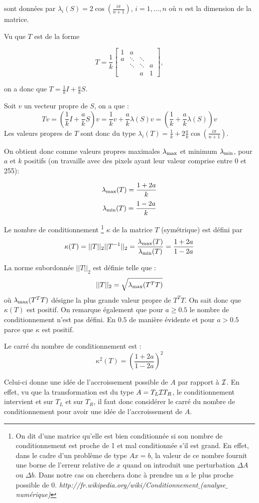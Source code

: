 sont données par $\lambda_i(S) = 2 \cos(\frac{i\pi}{n+1})$, $i= 1, \ldots , n$ où $n$ est la dimension de la matrice.

Vu que $T$ est de la forme

$$
 T = \frac{1}{k}
 \begin{bmatrix}
    1 & a 		& 			& \\
    a & \ddots 	& \ddots 	& \\
      & \ddots 	& \ddots 	& a \\
      & 		& a			& 1
  \end{bmatrix},
$$

on a donc que $T = \frac{1}{k} I + \frac{a}{k} S$.

Soit $v$ un vecteur propre de $S$, on a que :
\begin{equation}
T v = \left( \frac{1}{k} I + \frac{a}{k} S \right) v =
\frac{1}{k} v + \frac{a}{k} \lambda(S) v = \left(\frac{1}{k} + \frac{a}{k} \lambda(S)\right) v
\end{equation}
Les valeurs propres de $T$ sont donc du type $\lambda_i(T) = \frac{1}{k} + 2 \frac{a}{k} \cos(\frac{i\pi}{n+1})$.

On obtient donc comme valeurs propres maximales $\lambda_\mathrm{max}$ et minimum $\lambda_\mathrm{min}$,
pour $a$ et $k$ positifs (on travaille avec des pixels ayant leur valeur comprise entre 0 et 255):

$$\lambda_\mathrm{max} (T) =  \frac{1+2a}{k} $$
$$\lambda_\mathrm{min} (T) =  \frac{1-2a}{k} $$

Le nombre de conditionnement
\footnote{On dit d'une matrice qu'elle est bien conditionnée si son nombre de conditionnement
  est proche de 1 et mal conditionnée s'il est grand.
En effet, dans le cadre d'un problème de type $Ax = b$,
la valeur de ce nombre fournit une borne de l'erreur relative de $x$ quand on introduit une perturbation $\Delta A $ ou $\Delta b$.
Dans notre cas on cherchera donc à prendre un $a$ le plus proche possible de 0.
\textit{http://fr.wikipedia.org/wiki/Conditionnement$\_$(analyse$\_$numérique)}}
 $\kappa$ de la matrice $T$ (symétrique) est défini par
\begin{equation}
	\kappa (T) = ||T||_2||T^{-1}||_2 = \frac{\lambda_\mathrm{max} (T)}{\lambda_\mathrm{min} (T)} = \frac{1+2a}{1-2a}
\end{equation}

La norme subordonnée $||T||_2$ est définie telle que :
$$||T||_2 = \sqrt{\lambda_\mathrm{max}(T^TT)}$$
où $\lambda_\mathrm{max}(T^TT)$ désigne la plus grande valeur propre de $T^TT$.
On sait donc que $\kappa(T) $ est positif.
On remarque également que pour $a \geq 0.5$ le nombre de conditionnement n'est pas défini.
En $0.5$ de manière évidente et pour $a > 0.5$ parce que $\kappa$ est positif.

Le carré du nombre de conditionnement est :
\begin{equation}
	\kappa^2 (T) = \left(\frac{1+2a}{1-2a}\right)^2
\end{equation}

Celui-ci donne une idée de l'accroissement possible de $A$ par rapport à $\mathcal{I}$.
En effet, vu que la transformation est du type $A = T_L \mathcal{I} T_R$,
le conditionnement intervient et sur $T_L$ et sur $T_R$,
il faut donc considérer le carré du nombre de conditionnement pour avoir une idée de l'accroissement de $A$.
